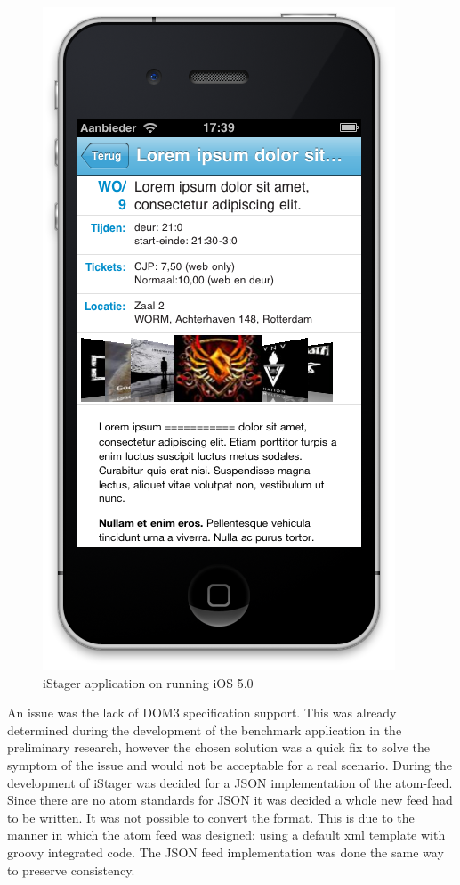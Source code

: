 \begin{figure}
\begin{minipage}{2.2in}
		\includegraphics[scale=0.15]{images/iStager_2.png}
	\end{minipage}%
	\caption{iStager application on running iOS 5.0}%
	\label{fig:1figs}%
\end{figure}


An issue was the lack of DOM3 specification support. This was already determined during the development of the benchmark application in the preliminary research, however the chosen solution was a quick fix to solve the symptom of the issue and would not be acceptable for a real scenario. During the development of iStager was decided for a JSON implementation of the atom-feed. Since there are no atom standards for JSON it was decided a whole new feed had to be written. It was not possible to convert the format. This is due to the manner in which the atom feed was designed: using a default xml template with groovy integrated code. The JSON feed implementation was done the same way to preserve consistency.


